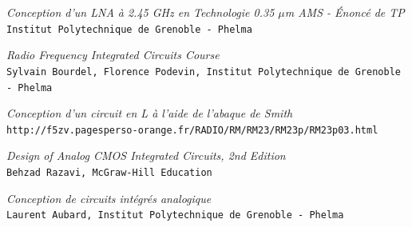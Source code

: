 \documentclass[a4paper]{article}
\begin{document}
\begin{thebibliography}{9}

\textit{Conception d'un LNA \`a 2.45 GHz en Technologie 0.35 $\mu$m AMS - \'Enonc\'e de TP}\\
\texttt{Institut Polytechnique de Grenoble - Phelma}

\textit{Radio Frequency Integrated Circuits Course}\\
\texttt{Sylvain Bourdel, Florence Podevin, Institut Polytechnique de Grenoble - Phelma}

\textit{Conception d'un circuit en L \`a l'aide de l'abaque de Smith}\\
\texttt{http://f5zv.pagesperso-orange.fr/RADIO/RM/RM23/RM23p/RM23p03.html}

\textit{Design of Analog CMOS Integrated Circuits, 2nd Edition}\\
\texttt{Behzad Razavi, McGraw-Hill Education}

\textit{Conception de circuits int\'egr\'es analogique}\\
\texttt{Laurent Aubard, Institut Polytechnique de Grenoble - Phelma}

\end{thebibliography}
\end{document}
